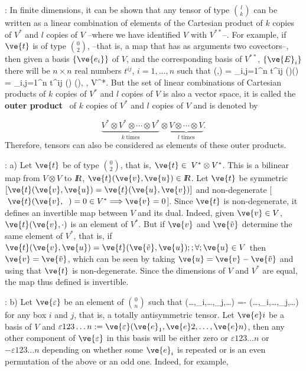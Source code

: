 \noi{}:
In finite dimensions, it can be shown that any tensor of type ${l \choose k}$
can be written as a linear combination of elements of the Cartesian product of $k$ copies of $V^*$ and $l$ copies of $V$ 
--where we have identified $V$ with $V^{**}$--. 
For example, if $\ve{t}$ is of type ${0 \choose 2}$, --that is, a map that has as arguments two covectors--, 
then given a basis $\{\ve{e_{i}}\}$ of $V$, and the corresponding basis of $V^{**}$, $\{\ve{E}_{i}\}$ there will be $n \times n$ real numbers $t^{ij}$, $i=1, \ldots ,n$ such that 
\beq
{}(\ve{\sigma},\ve{\omega}) = 
\sum_{i,j=1}^{n} t^{ij} (\ve{\sigma})(\ve{\omega})
=
\sum_{i,j=1}^{n} t^{ij} \ve{\sigma}() \ve{\omega}(), 
\;\;\;\; \forall \ve{\sigma},\;\ve{\omega} \in V^*.
\eeq
%
But the set of linear combinations of Cartesian products of
$k$ copies of $V^*$ and $l$ copies of $V$ is also a vector
space, it is called the {\bf outer product}~ 
of  $k$ copies of $V^*$ and $l$ copies of $V$ and is denoted by 

\[
\underbrace{V^*\otimes V^*\otimes\cdots\otimes V^*}_{k\;\mbox{times}}
\otimes\underbrace{ V\otimes \cdots\otimes V}_{l\;\mbox{times}}.
\]
%
Therefore, tensors can also be considered as elements
of these outer products.

\ejem: a) Let $\ve{ t}$ be of type ${0 \choose 2}$, that is, $\ve{ t}\in\;V^*\otimes V^*$. 
This is a bilinear map from $V\otimes V$ to $\mbox{\sl {l$\!\!\!\;\:\!$R}}$, $\ve{ t}(\ve{v},\ve{u})\in \re$. Let
$\ve{ t}$ be symmetric $[\ve{ t}(\ve{v},\ve{u})=\ve{ t}(\ve{u},\ve{v})]$ and non-degenerate 
[$\; \ve{ t}(\ve{v},\;\;)= 0
\in V^*\Longrightarrow \ve{v}=0$]. 
Since $\ve{ t}$ is non-degenerate, it defines an invertible map between $V$ and its dual. 
Indeed, given $\ve{v} \in V$, $\ve{t}(\ve{v},\cdot)$ is an element of $V^*$. 
But if $\ve{v}$ and $\ve{\tilde{v}}$ determine the same element of $V^*$, that is, if $\ve{ t}(\ve{v},\ve{u}) = \ve{ t}(\ve{\tilde{v}},\ve{u}) ;; \forall ; \ve{u} \in V$ then $\ve{v}=\ve{\tilde{v}}$, which can be seen by taking $\ve{u} = \ve{v} - \ve{\tilde{v}}$ and using that $\ve{t}$ is non-degenerate. Since the dimensions of $V$ and $V^{*}$ are equal, the map thus defined is invertible.

\ejem: b) Let $\ve{\varepsilon}$ be an element of ${0 \choose n}$ such that \beq \ve{\varepsilon} (\ldots,_i,\ldots,_j,\ldots) =-\ve{\varepsilon} (\ldots,_i,\ldots,_j,\ldots) \eeq \noi for any box $i$ and $j$, that is, a totally antisymmetric tensor. Let ${\ve{e}i}$ be a basis of $V$ and $\varepsilon{123\ldots n}:= \ve{\varepsilon} (\ve{e}_1,\ve{e}2,\ldots,\ve{e}n)$, then any other component of $\ve{\varepsilon}$ in this basis will be either zero or $\varepsilon{123\ldots n}$ or $-\varepsilon{123\ldots n}$ depending on whether some $\ve{e}_i$ is repeated or is an even permutation of the above or an odd one. Indeed, for example,


